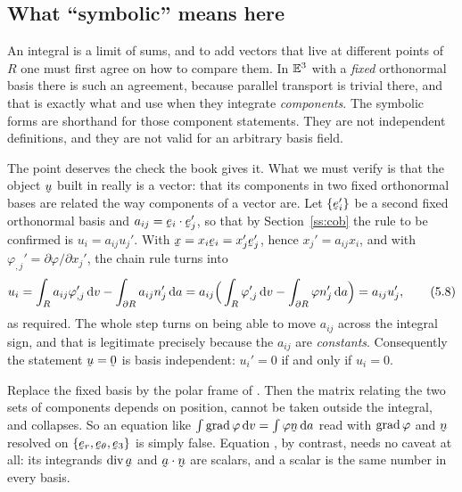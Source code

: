 \subsection*{What ``symbolic'' means here}

\begin{remark}\label{rem:symbolic}
An integral is a limit of sums, and to add vectors that live at different
points of $R$ one must first agree on how to compare them. In $\mathbb{E}^{3}$ with a
\emph{fixed} orthonormal basis there is such an agreement, because parallel transport is trivial there,
and that is exactly what  and 
use when they integrate \emph{components}. The symbolic forms 
are shorthand for those component statements. They are not independent
definitions, and they are not valid for an arbitrary basis field.
\end{remark}

The point deserves the check the book gives it. What we must verify is
that the object $\bu$ built in  really is a vector: that its
components in two fixed orthonormal bases are related the way components
of a vector are. Let $\{\be_{i}'\}$ be a second fixed orthonormal basis
and $a_{ij}=\ip{\be_{i}}{\be_{j}'}$, so that by Section~\ref{ss:cob} the
rule to be confirmed is $u_{i}=a_{ij}u_{j}'$. With
$\bx=x_{i}\be_{i}=x_{j}'\be_{j}'$, hence $x_{j}'=a_{ij}x_{i}$, and with
$\varphi_{,j}'=\partial\varphi/\partial x_{j}'$, the chain rule turns
 into
\begin{equation}
   u_{i}=\int_{R}a_{ij}\varphi_{,j}'\,\mathrm{d} v
        -\int_{\partial R}a_{ij}n_{j}'\,\mathrm{d} a
        =a_{ij}\Big(\int_{R}\varphi_{,j}'\,\mathrm{d} v
        -\int_{\partial R}\varphi n_{j}'\,\mathrm{d} a\Big)
        =a_{ij}u_{j}' ,
   \tag{5.8}\label{eq:5.8}
\end{equation}
as required. The whole step turns on being able to move $a_{ij}$ across
the integral sign, and that is legitimate precisely because the $a_{ij}$
are \emph{constants}. Consequently the statement $\bu=\bze$ is basis
independent: $u_{i}'=0$ if and only if $u_{i}=0$.

\begin{remark}\label{rem:polarfail}
Replace the fixed basis by the polar frame of . Then the
matrix relating the two sets of components depends on position, cannot be
taken outside the integral, and  collapses. So an equation like
$\int\grad\varphi\,\dl v=\int\varphi\bn\,\dl a$ read with $\operatorname{grad}\varphi$
and $\bn$ resolved on $\{\ber,\bet,\be_{3}\}$ is simply false. Equation
, by contrast, needs no caveat at all: its integrands
$\dvg\ba$ and $\ip\ba\bn$ are scalars, and a scalar is the same number in
every basis.
\end{remark}

